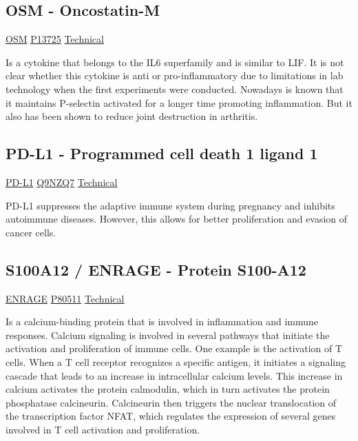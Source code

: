 \subsection{OSM - Oncostatin-M}

\href{https://en.wikipedia.org/wiki/Oncostatin_M}{OSM}
\href{http://www.uniprot.org/uniprot/P13725}{P13725}
\href{https://olink.com/products-services/target/protein/?assayID=5085}{Technical}

Is a cytokine that belongs to the IL6 superfamily and is similar to LIF. It is not clear whether this cytokine is anti or pro-inflammatory due to limitations in lab technology when the first experiments were conducted. Nowadays is known that it maintains P-selectin activated for a longer time promoting inflammation. But it also has been shown to reduce joint destruction in arthritis.

\subsection{PD-L1 - Programmed cell death 1 ligand 1}

\href{https://en.wikipedia.org/wiki/PD-L1}{PD-L1}
\href{http://www.uniprot.org/uniprot/Q9NZQ7}{Q9NZQ7}
\href{https://olink.com/products-services/target/protein/?assayID=5057}{Technical}

PD-L1 suppresses the adaptive immune system during pregnancy and inhibits autoimmune diseases. However, this allows for better proliferation and evasion of cancer cells.

\subsection{S100A12 / ENRAGE - Protein S100-A12}

\href{https://en.wikipedia.org/wiki/S100A12}{ENRAGE}
\href{http://www.uniprot.org/uniprot/P80511}{P80511}
\href{https://olink.com/products-services/target/protein/?assayID=5096}{Technical}

Is a calcium-binding protein that is involved in inflammation and immune responses. Calcium signaling is involved in several pathways that initiate the activation and proliferation of immune cells. One example is the activation of T cells. When a T cell receptor recognizes a specific antigen, it initiates a signaling cascade that leads to an increase in intracellular calcium levels. This increase in calcium activates the protein calmodulin, which in turn activates the protein phosphatase calcineurin. Calcineurin then triggers the nuclear translocation of the transcription factor NFAT, which regulates the expression of several genes involved in T cell activation and proliferation.

